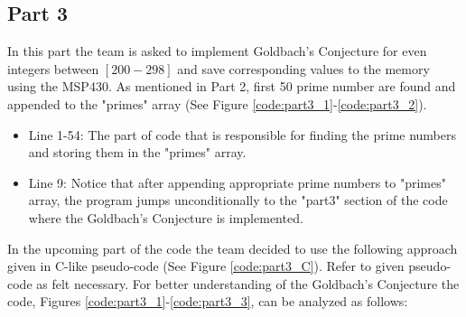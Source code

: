 \documentclass[pdftex,12pt,a4paper]{article}
\begin{document}
\subsection{Part 3}
\newline
In this part the team is asked to implement Goldbach's Conjecture for even integers between $[200-298]$ and save corresponding values to the memory using the MSP430. As mentioned in Part 2, first 50 prime number are found and appended to the "primes" array (See Figure \ref{code:part3_1}-\ref{code:part3_2}).
\begin{itemize}
    \item Line 1-54: The part of code that is responsible for finding the prime numbers and storing them in the "primes" array.
    \item Line 9: Notice that after appending appropriate prime numbers to "primes" array, the program jumps unconditionally to the "part3" section of the code where the Goldbach's Conjecture is implemented.
\end{itemize}
\newline
In the upcoming part of the code the team decided to use the following approach given in C-like pseudo-code (See Figure \ref{code:part3_C}). Refer to given pseudo-code as felt necessary.
For better understanding of the Goldbach's Conjecture the code, Figures \ref{code:part3_1}-\ref{code:part3_3}, can be analyzed as follows:
\end{document}
